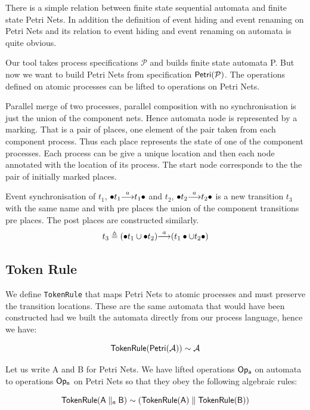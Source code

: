 \documentclass[]{article}
\begin{document}
{There is a simple relation between finite state sequential automata and finite state Petri Nets. In addition the definition of event hiding and event renaming   on Petri Nets and its relation to event hiding and event renaming   on  automata is quite obvious.



Our tool takes process specifications $\mathcal{P}$ and builds finite state automata {\sf P}. But now we want to build Petri Nets from specification ${\sf Petri(\mathcal{P})}$. The operations defined on atomic processes can be lifted to operations on Petri Nets.

Parallel merge of two processes, parallel composition with no synchronisation is just the union of the component nets. Hence automata node is represented by a marking. That is a pair of places, one element of the pair taken from each component process. Thus each place represents the state of one of the component processes. Each process can be give a unique location and then each node annotated with the location of its process. 
The start node corresponds to the the pair of initially marked places.

Event synchronisation of $t_1$, ${\bullet t_1}{\stackrel{a}{\longrightarrow}}{t_1\bullet} $ and $t_2$, ${\bullet t_2}{\stackrel{a}{\longrightarrow}}{t_2\bullet} $ is a new transition $t_3$ with the same name and with pre places the union of the component transitions pre places. The post places are constructed similarly.
\[t_3\triangleq {(\bullet t_1\cup \bullet t_2)}{\stackrel{a}{\longrightarrow}}{(t_1\bullet \cup t_2\bullet) } \]




\subsection{Token Rule}
 

 We define \verb|TokenRule| that maps Petri Nets to atomic processes and must preserve the transition  locations.  These are the same automata that would have been constructed had we built the automata directly from our process language, hence we have:

\[{\sf TokenRule(Petri(\mathcal{A}))\sim  \mathcal{A}}\]  

Let us write {\sf A} and {\sf B} for Petri Nets. We have   lifted   operations ${\sf Op_a}$ on automata to   operations ${\sf Op_n}$ on Petri Nets  so that they obey  the following algebraic rules:

\[{\sf TokenRule({\sf A}\parallel_n {\sf B})\sim  (TokenRule({\sf A})\parallel TokenRule({\sf B})) }\]  

}
\end{document}
